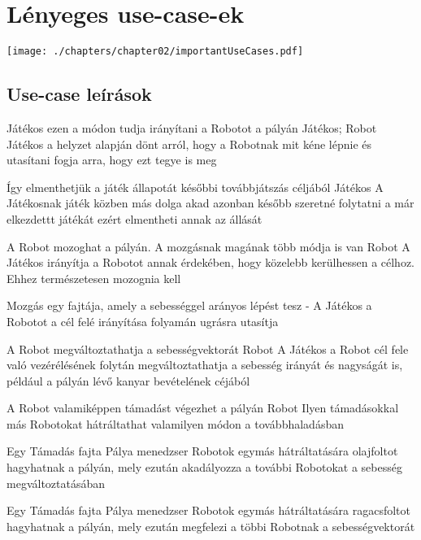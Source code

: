 \section{Lényeges use-case-ek}
\texttt{[image: ./chapters/chapter02/importantUseCases.pdf]}

\subsection{Use-case leírások}

%
{Játékos ezen a módon tudja irányítani a Robotot a pályán}%
{Játékos; Robot}%
{Játékos a helyzet alapján dönt arról, hogy a Robotnak mit kéne lépnie és utasítani fogja arra, hogy ezt tegye is meg}

%
{Így elmenthetjük a játék állapotát későbbi továbbjátszás céljából}%
{Játékos}%
{A Játékosnak játék közben más dolga akad azonban később szeretné folytatni a már elkezdettt játékát ezért elmentheti annak az állását}

%
{A Robot mozoghat a pályán. A mozgásnak magának több módja is van}
{Robot}
{A Játékos irányítja a Robotot annak érdekében, hogy közelebb kerülhessen a célhoz. Ehhez természetesen mozognia kell}

%
{Mozgás egy fajtája, amely a sebességgel arányos lépést tesz}%
{-}%
{A Játékos a Robotot a cél felé irányítása folyamán ugrásra utasítja}

%
{A Robot megváltoztathatja a sebességvektorát}%
{Robot}%
{A Játékos a Robot cél fele való vezérélésének folytán megváltoztathatja a sebesség irányát és nagyságát is, például a pályán lévő kanyar bevételének céjából}

%
{A Robot valamiképpen támadást végezhet a pályán}%
{Robot}%
{Ilyen támadásokkal más Robotokat hátráltathat valamilyen módon a továbbhaladásban}

%
{Egy Támadás fajta}%
{Pálya menedzser}%
{Robotok egymás hátráltatására olajfoltot hagyhatnak a pályán, mely ezután akadályozza a további Robotokat a sebesség megváltoztatásában}

%
{Egy Támadás fajta}%
{Pálya menedzser}%
{Robotok egymás hátráltatására ragacsfoltot hagyhatnak a pályán, mely ezután megfelezi a többi Robotnak a sebességvektorát}

